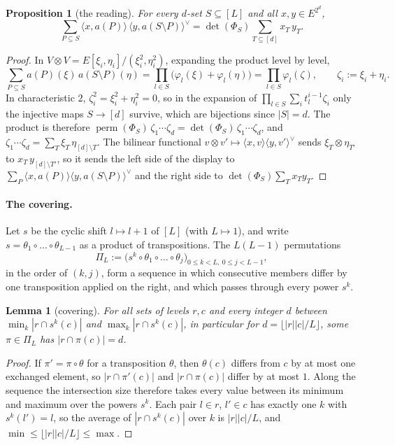 \documentclass[11pt]{article}
\newtheorem{lemma}[theorem]{Lemma}
\newtheorem{proposition}[theorem]{Proposition}
\theoremstyle{definition}
\theoremstyle{remark}
\newcommand{\pairL}[2]{\langle #1,#2\rangle}
\newcommand{\pairR}[2]{\langle #1,#2\rangle^{\vee}}
\DeclareMathOperator{\perm}{perm}
\begin{document}
\begin{proposition}[the reading]\label{prop:B}
For every $d$-set $S\subseteq[L]$ and all $x,y\in E^{2^d}$,
\[
\sum_{P\subseteq S}\pairL x{a(P)}\,\pairR y{a(S\setminus P)}=\det(\Phi_S)\sum_{T\subseteq[d]}x_T\,y_T.
\]
\end{proposition}

\begin{proof}
In $V\otimes V=E[\xi_i,\eta_i]/(\xi_i^2,\eta_i^2)$, expanding the product level by level,
\[
\sum_{P\subseteq S}a(P)(\xi)\,a(S\setminus P)(\eta)=\prod_{l\in S}\bigl(\varphi_l(\xi)+\varphi_l(\eta)\bigr)=\prod_{l\in S}\varphi_l(\zeta),\qquad\zeta_i:=\xi_i+\eta_i.
\]
In characteristic $2$, $\zeta_i^2=\xi_i^2+\eta_i^2=0$, so in the expansion of $\prod_{l\in S}\sum_it_l^{i-1}\zeta_i$ only the injective maps $S\to[d]$ survive, which are bijections since $|S|=d$. The product is therefore $\perm(\Phi_S)\,\zeta_1\cdots\zeta_d=\det(\Phi_S)\,\zeta_1\cdots\zeta_d$, and $\zeta_1\cdots\zeta_d=\sum_T\xi_T\,\eta_{[d]\setminus T}$. The bilinear functional $v\otimes v'\mapsto\pairL xv\pairR y{v'}$ sends $\xi_T\otimes\eta_{T'}$ to $x_T\,y_{[d]\setminus T'}$, so it sends the left side of the display to $\sum_{P}\pairL x{a(P)}\pairR y{a(S\setminus P)}$ and the right side to $\det(\Phi_S)\sum_Tx_Ty_T$.
\end{proof}

\paragraph{The covering.} Let $s$ be the cyclic shift $l\mapsto l+1$ of $[L]$ (with $L\mapsto1$), and write $s=\theta_1\circ\dots\circ\theta_{L-1}$ as a product of transpositions. The $L(L-1)$ permutations
\[
\Pi_L:=\bigl(s^k\circ\theta_1\circ\dots\circ\theta_j\bigr)_{0\le k<L,\ 0\le j<L-1},
\]
in the order of $(k,j)$, form a sequence in which consecutive members differ by one transposition applied on the right, and which passes through every power $s^k$.

\begin{lemma}[covering]\label{lem:C}
For all sets of levels $r,c$ and every integer $d$ between $\min_k|r\cap s^k(c)|$ and $\max_k|r\cap s^k(c)|$, in particular for $d=\lfloor|r||c|/L\rfloor$, some $\pi\in\Pi_L$ has $|r\cap\pi(c)|=d$.
\end{lemma}

\begin{proof}
If $\pi'=\pi\circ\theta$ for a transposition $\theta$, then $\theta(c)$ differs from $c$ by at most one exchanged element, so $|r\cap\pi'(c)|$ and $|r\cap\pi(c)|$ differ by at most $1$. Along the sequence the intersection size therefore takes every value between its minimum and maximum over the powers $s^k$. Each pair $l\in r$, $l'\in c$ has exactly one $k$ with $s^k(l')=l$, so the average of $|r\cap s^k(c)|$ over $k$ is $|r||c|/L$, and $\min\le\lfloor|r||c|/L\rfloor\le\max$.
\end{proof}
\end{document}
